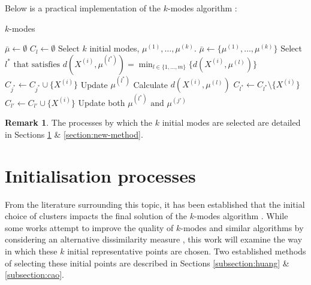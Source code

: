 \documentclass{article}
\theoremstyle{definition}
\newtheorem*{remark}{Remark}
\begin{document}
Below is a practical implementation of the $k$-modes algorithm \cite{Huang98}:

\begin{algorithm}[H]
\caption{$k$-modes}\label{alg:kmodes}
	\begin{algorithmic}[0] 
		\State $\bar{\mu} \gets \emptyset$
			\State $C_l \gets \emptyset$
		\EndFor
		\State Select $k$ initial modes, $\mu^{(1)}, \ldots, \mu^{(k)}$.
		\State $\bar{\mu} \gets \{\mu^{(1)}, \ldots, \mu^{(k)}\}$
			\State Select $l^* \text{ that satisfies } d(X^{(i)}, 
				\mu^{(l^*)}) = \min_{l \in \{1, \ldots, m\}} 
				\{d(X^{(i)}, \mu^{(l)})\}$
			\State $C_{j^*} \gets C_{j^*} \cup \{X^{(i)}\}$
			\State Update $\mu^{(l^*)}$
		\EndFor
		\Repeat
					\State Calculate $d(X^{(i)}, \mu^{(l)})$
				\EndFor
					\State $C_{l^*} \gets C_{l^*} \setminus
						\{X^{(i)}\}$
					\State $C_{l'} \gets C_{l'} \cup 
						\{X^{(i)}\}$
					\State Update both $\mu^{(l^*)} 
						\text{ and } \mu^{(j')}$
				\EndIf
			\EndFor
	\end{algorithmic}
\end{algorithm}

\begin{remark}
	The processes by which the $k$ initial modes are selected are detailed 
	in Sections \ref{section:init} \& \ref{section:new-method}.
\end{remark}



\section{Initialisation processes}\label{section:init}

From the literature surrounding this topic, it has been established that the 
initial choice of clusters impacts the final solution of the $k$-modes algorithm 
\cite{Huang98}\cite{Cao09}. While some works attempt to improve the quality of 
$k$-modes and similar algorithms by considering an alternative dissimilarity 
measure \cite{Ng07}, this work will examine the way in which these $k$ initial 
representative points are chosen. Two established methods of selecting these 
initial points are described in Sections \ref{subsection:huang} \& 
\ref{subsection:cao}.
\end{document}
